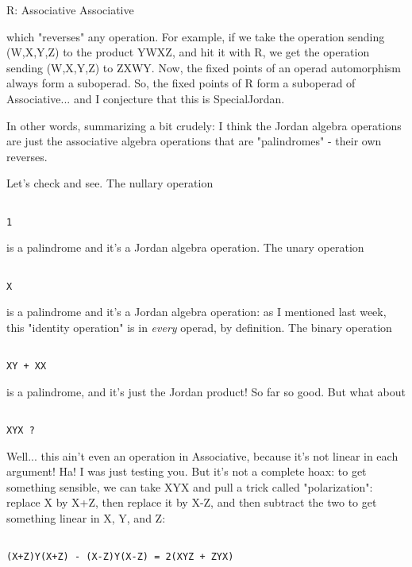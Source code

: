 R: Associative \to  Associative
$$
    

which "reverses" any operation.  For example, if we take the
operation sending (W,X,Y,Z) to the product YWXZ, and hit it with R, we
get the operation sending (W,X,Y,Z) to ZXWY.  Now, the fixed points of
an operad automorphism always form a suboperad.  So, the fixed points of
R form a suboperad of Associative... and I conjecture that this is
SpecialJordan.

In other words, summarizing a bit crudely: I think the Jordan algebra
operations are just the associative algebra operations that are
"palindromes" - their own reverses.

Let's check and see.  The nullary operation


\begin{verbatim}

1
\end{verbatim}
    
is a palindrome and it's a Jordan algebra operation.  The unary
operation


\begin{verbatim}

X
\end{verbatim}
    
is a palindrome and it's a Jordan algebra operation: as I mentioned last
week, this "identity operation" is in \emph{every} 
operad, by definition.
The binary operation


\begin{verbatim}

XY + XX
\end{verbatim}
    
is a palindrome, and it's just the Jordan product!  So far so good.  
But what about


\begin{verbatim}

XYX ?
\end{verbatim}
    
Well... this ain't even an operation in Associative, because it's not
linear in each argument!  Ha!  I was just testing you.  But it's not a
complete hoax: to get something sensible, we can take XYX and pull a
trick called "polarization": replace X by X+Z, then replace it
by X-Z, and then subtract the two to get something linear in X, Y, and
Z:


\begin{verbatim}

(X+Z)Y(X+Z) - (X-Z)Y(X-Z) = 2(XYZ + ZYX)
\end{verbatim}
    
